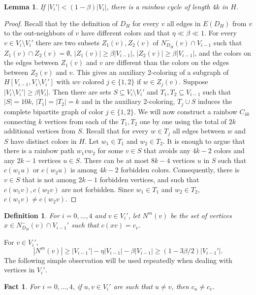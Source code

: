 \documentclass{article}
\newtheorem{defn}[theorem]{Definition}
\newtheorem{fact}[theorem]{Fact}
\newtheorem{lemma}[theorem]{Lemma}
\begin{document}
\begin{lemma} \label{lem-V'}  If $|V_i'| < (1-\beta)|V_i|$, there is a rainbow cycle  of length $4k$ in $H$.
\end{lemma}

\begin{proof}Recall that by the definition of $D_H$ for every $v$ all edges in $E(D_H)$ from $v$ to the out-neighbors of $v$  have different colors and that $\eta \ll \beta \ll 1$. For every $v\in V_i\setminus V_i'$ there are two subsets $Z_1(v), Z_2(v)$ of $N_{D_H}^-(v)\cap V_{i-1}$ such that $Z_1(v)\cap Z_2(v)=\emptyset$, $|Z_1(v)|\geq \beta |V_{i-1}|$, $|Z_2(v)|\geq \beta |V_{i-1}|$, and the colors on the edges between $Z_1(v)$ and $v$ are different than the colors on the edges between $Z_2(v)$ and $v$. This gives an auxiliary 2-coloring of a subgraph of $H[V_{i-1}, V_i\setminus V_i']$ with $wv$ colored $j\in \{1,2\}$ if $w\in Z_j(v).$
Suppose $|V_i\setminus V_i'|\geq \beta |V_i|.$ Then  there are sets $S\subseteq V_i\setminus V_i'$ and $T_1, T_2\subseteq V_{i-1}$ such that $|S|=10k$, $|T_1|=|T_2|=k$ and in the auxiliary 2-coloring, $T_j\cup S$ induces the complete bipartite graph of color $j\in \{1,2\}$.
We will now construct a rainbow $C_{4k}$ connecting $k$ vertices from each of the $T_1, T_2$ one by one  using the total of $2k$ additional vertices from $S$. Recall that for every $w\in T_j$ all edges between $w$ and $S$ have distinct colors in $H$. 
Let $w_1\in T_1$ and $w_2\in T_2$. It is enough to argue that there is a rainbow path $w_1vw_2$  for some $v\in S$ that avoids any $4k-2$ colors and any $2k-1$ vertices $u\in S$. There can be at most $8k-4$ vertices $u$ in $S$ such that $c(w_1u)$ or $c(w_2u)$ is among $4k-2$ forbidden colors. Consequently, there is $v\in S$ that is not among $2k-1$ forbidden vertices, and such that $c(w_1v), c(w_2v)$ are not forbidden. Since $w_1\in T_1$ and $w_2\in T_2$, $c(w_1v)\neq c(w_2v)$.
\end{proof} 
\begin{defn}
     For $i=0, \dots, 4$ and $v\in V_i'$, let $N^m(v)$ be the set of vertices $x\in N^-_{D_H}(v)\cap V_{i-1}'$ such that $c(xv)=c_v$.
 \end{defn}
 For $v\in V_i'$,
 \begin{equation}\label{ext-Nm}
 |N^m(v)|\geq |V_{i-1}'|- \eta |V_{i-1}|-\beta|V_{i-1}|\geq (1-3\beta/2)|V_{i-1}'|.
 \end{equation}
The following simple observation will be used repeatedly when dealing with vertices in $V_i'$.
 \begin{fact}\label{ext-fact3}
 For $i=0, \dots, 4$, if $u, v \in V_i'$ are such that $u\neq v$, then $c_u\neq c_v$. 
 \end{fact}
\end{document}
